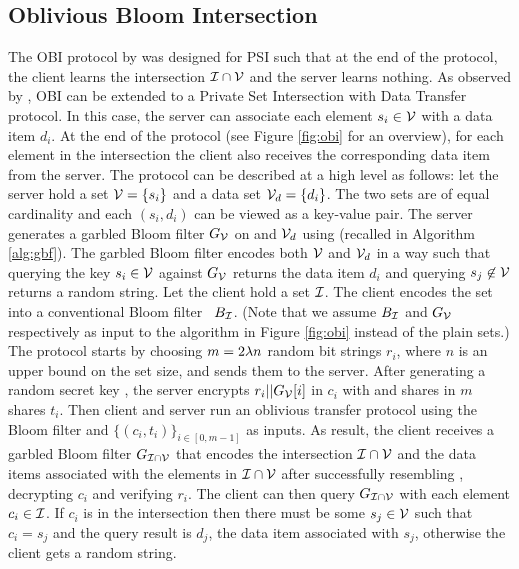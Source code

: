 \subsection{Oblivious Bloom Intersection}\label{sec:obi}
The \ac{OBI} protocol by \citet{DongCW13} was designed for \ac{PSI} such that at the end of the protocol, the client learns the intersection $\mathcal{I}\cap \mathcal{V}$ and the server learns nothing. 
As observed by \citet{WenD14}, \ac{OBI} can be extended to a Private Set Intersection with Data Transfer protocol. 
In this case, the server can associate each element $s_i\in\mathcal{V}$ with a data item $d_i$. 
At the end of the protocol (see Figure \ref{fig:obi} for an overview), for each element in the intersection the client also receives the corresponding data item from the server. 
The protocol can be described at a high level as follows: let the server hold a set $\mathcal{V}=\{s_i\}$ and a data set $\mathcal{V}_d=\{d_{i}\}$. The two sets are of equal cardinality and each $(s_i,d_i)$ can be viewed as a key-value pair. 
The server generates a garbled Bloom filter $G_\mathcal{V}$ on \ServerSet and $\mathcal{V}_d$ using \citet[Algorithm 1]{WenD14} (recalled in Algorithm \ref{alg:gbf}). 
The garbled Bloom filter encodes both $\mathcal{V}$ and $\mathcal{V}_d$ in a way such that querying the key $s_i\in\mathcal{V}$ against $G_\mathcal{V}$ returns the data item $d_i$ and querying $s_j\not \in \mathcal{V}$ returns a random string. 
Let the client hold a set $\mathcal{I}$. 
The client encodes the set into a conventional Bloom filter~\cite{blo70} $B_\mathcal{I}$. 
(Note that we assume $B_\mathcal{I}$ and $G_\mathcal{V}$ respectively as input to the algorithm in Figure \ref{fig:obi} instead of the plain sets.)
The protocol starts by choosing $m=2\lambda n$ random bit strings $r_i$, where $n$ is an upper bound on the set size, and sends them to the server.
After generating a random secret key \sk, the server encrypts $r_i||G_\mathcal{V}[i]$ in $c_i$ with \sk and shares \sk in $m$ shares $t_i$.
Then client and server run an oblivious transfer protocol using the Bloom filter and $\{(c_i, t_i)\}_{i\in[0,m-1]}$ as inputs. 
As result, the client receives a garbled Bloom filter $G_{\mathcal{I}\cap\mathcal{V}}$ that encodes the intersection $\mathcal{I}\cap \mathcal{V}$ and the data items associated with the elements in $\mathcal{I}\cap \mathcal{V}$ after successfully resembling \sk, decrypting $c_i$ and verifying $r_i$. 
The client can then query $G_{\mathcal{I}\cap\mathcal{V}}$ with each element $c_i\in\mathcal{I}$. If $c_i$ is in the intersection then there must be  some $s_j\in \mathcal{V}$ such that $c_i=s_j$ and the query result is $d_j$, the data item associated with $s_j$, otherwise the client gets a random string. 

